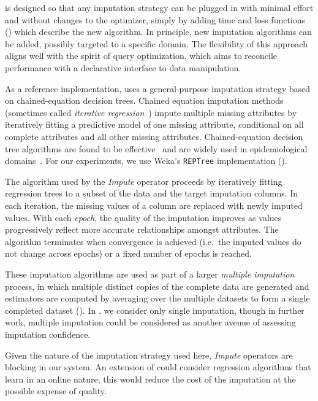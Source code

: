 \ProjectName{} is designed so that any imputation strategy can be plugged in with minimal
effort and without changes to the optimizer, simply by adding time and loss functions
() which describe the new algorithm. In principle, new imputation algorithms
can be added, possibly targeted to a specific domain. The flexibility of this approach
aligns well with the spirit of query optimization, which aims to reconcile performance with
a declarative interface to data manipulation. 

As a reference implementation, \ProjectName{} uses a general-purpose imputation strategy
based on chained-equation decision trees.  Chained equation
imputation methods~\cite{vanbuuren2011mice} (sometimes called \textit{iterative
regression}~\cite{gelman2006data}) impute multiple missing attributes by iteratively fitting
a predictive model of one missing attribute, conditional on all complete attributes
and all other missing attributes. Chained-equation decision tree algorithms are found to be
effective~\cite{akande2015empirical} and are widely used in epidemiological
domains~\cite{burgette2010multiple}. For our experiments, we use Weka's {\tt REPTree}
implementation (\cite{witten2016data}).

The algorithm used by the \textit{Impute} operator proceeds by iteratively fitting regression trees to a subset of the
data and the target imputation columns. In each iteration, the missing values of a column are
replaced with newly imputed values. With each {\it epoch}, the quality of the imputation
improves as values progressively reflect more accurate relationships amongst attributes. The
algorithm terminates when convergence is achieved (i.e.\ the imputed values do not change
across epochs) or a fixed number of epochs is reached. 

These imputation algorithms are used as part of a larger \textit{multiple imputation}
process, in which multiple distinct copies of the complete data are generated and estimators
are computed by averaging over the multiple datasets to form a single completed dataset
(\cite{gelman2006data}). In \ProjectName{}, we consider only single imputation, though in
further work, multiple imputation could be considered as another avenue of assessing
imputation confidence.

Given the nature of the imputation strategy used here, {\it Impute} operators are blocking
in our system. An extension of \ProjectName{} could consider regression algorithms that learn in
an online nature; this would reduce the cost of the imputation at the possible expense of
quality.

